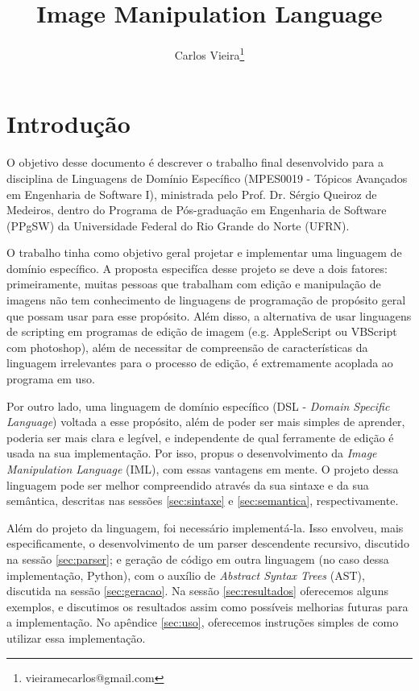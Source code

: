 \documentclass{article}
\title{Image Manipulation Language}
\author{Carlos Vieira\thanks{vieiramecarlos@gmail.com}}
\begin{document}
\maketitle

\section{Introdução}
O objetivo desse documento é descrever o trabalho final desenvolvido para a disciplina de Linguagens de Domínio Específico (MPES0019 - Tópicos Avançados em Engenharia de Software I), ministrada pelo Prof. Dr. Sérgio Queiroz de Medeiros, dentro do Programa de Pós-graduação em Engenharia de Software (PPgSW) da Universidade Federal do Rio Grande do Norte (UFRN).

O trabalho tinha como objetivo geral projetar e implementar uma linguagem de domínio específico. A proposta especifíca desse projeto se deve a dois fatores: primeiramente, muitas pessoas que trabalham com edição e manipulação de imagens não tem conhecimento de linguagens de programação de propósito geral que possam usar para esse propósito. Além disso, a alternativa de usar linguagens de scripting em programas de edição de imagem (e.g. AppleScript ou VBScript com photoshop), além de necessitar de compreensão de características da linguagem irrelevantes para o processo de edição, é extremamente acoplada ao programa em uso.

Por outro lado, uma linguagem de domínio específico (DSL - \emph{Domain Specific Language}) voltada a esse propósito, além de poder ser mais simples de aprender, poderia ser mais clara e legível, e independente de qual ferramente de edição é usada na sua implementação. Por isso, propus o desenvolvimento da \emph{Image Manipulation Language} (IML), com essas vantagens em mente. O projeto dessa linguagem pode ser melhor compreendido através da sua sintaxe e da sua semântica, descritas nas sessões \ref{sec:sintaxe} e \ref{sec:semantica}, respectivamente.

Além do projeto da linguagem, foi necessário implementá-la. Isso envolveu, mais especificamente, o desenvolvimento de um parser descendente recursivo, discutido na sessão \ref{sec:parser}; e geração de código em outra linguagem (no caso dessa implementação, Python), com o auxílio de \textit{Abstract Syntax Trees} (AST), discutida na sessão \ref{sec:geracao}. Na sessão \ref{sec:resultados} oferecemos alguns exemplos, e discutimos os resultados assim como possíveis melhorias futuras para a implementação. No apêndice \ref{sec:uso}, oferecemos instruções simples de como utilizar essa implementação.
\end{document}

